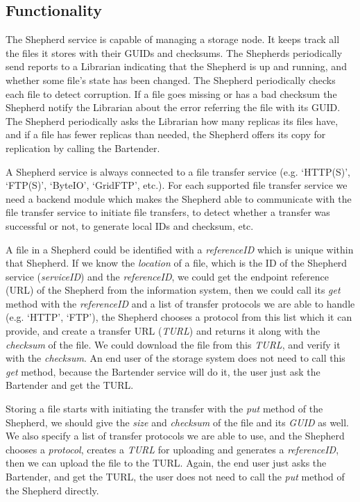 \documentclass{book}
\begin{document}
\subsection{Functionality} %

The Shepherd service is capable of managing a storage node. It keeps track all the files it stores with their GUIDs and checksums. The Shepherds periodically send reports to a Librarian indicating that the Shepherd is up and running, and whether some file's state has been changed. The Shepherd periodically checks each file to detect corruption. If a file goes missing or has a bad checksum the Shepherd notify the Librarian about the error referring the file with its GUID. The Shepherd periodically asks the Librarian how many replicas its files have, and if a file has fewer replicas than needed, the Shepherd offers its copy for replication by calling the Bartender.

A Shepherd service is always connected to a file transfer service (e.g. `HTTP(S)', `FTP(S)', `ByteIO', `GridFTP', etc.). For each supported file transfer service we need a backend module which makes the Shepherd able to communicate with the file transfer service to initiate file transfers, to detect whether a transfer was successful or not, to generate local IDs and checksum, etc.

A file in a Shepherd could be identified with a \emph{referenceID} which is unique within that Shepherd. If we know the \emph{location} of a file, which is the ID of the Shepherd service (\emph{serviceID}) and the \emph{referenceID}, we could get the endpoint reference (URL) of the Shepherd from the information system, then we could call its \emph{get} method with the \emph{referenceID} and a list of transfer protocols we are able to handle (e.g. `HTTP', `FTP'), the Shepherd chooses a protocol from this list which it can provide, and create a transfer URL (\emph{TURL}) and returns it along with the \emph{checksum} of the file. We could download the file from this \emph{TURL}, and verify it with the \emph{checksum}. An end user of the storage system does not need to call this \emph{get} method, because the Bartender service will do it, the user just ask the Bartender and get the TURL.

Storing a file starts with initiating the transfer with the \emph{put} method of the Shepherd, we should give the \emph{size} and \emph{checksum} of the file and its \emph{GUID} as well. We also specify a list of transfer protocols we are able to use, and the Shepherd chooses a \emph{protocol}, creates a \emph{TURL} for uploading and generates a \emph{referenceID}, then we can upload the file to the TURL. Again, the end user just asks the Bartender, and get the TURL, the user does not need to call the \emph{put} method of the Shepherd directly.
\end{document}

